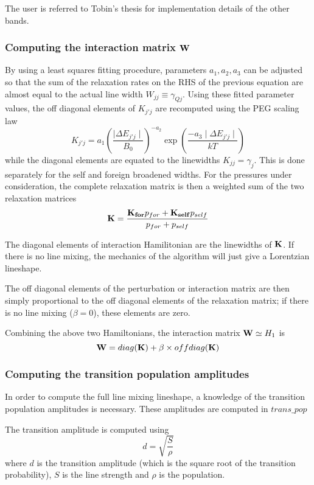 \documentclass[11pt]{article}
\begin{document}
The user is referred to Tobin's thesis \cite{tob:96} for implementation 
details of the other bands. 

\subsubsection{Computing the interaction matrix ${\bf W}$}
By using a least squares fitting procedure, parameters $a_{1},a_{2},a_{3}$
can be adjusted so that the sum of the relaxation rates
on the RHS of the previous equation are almost equal to the 
actual line width $W_{jj}\equiv\gamma_{Qj}$. Using these fitted parameter 
values, the off diagonal elements of $K_{j'j}$ are recomputed using the 
PEG scaling law
\[
 K_{j'j}=a_{1}\left(\frac{\mid\Delta E_{j'j}\mid}{B_{0}}\right)^{-a_{2}}
\exp\left(\frac{-a_{3}\mid\Delta E_{j'j}\mid}{kT}\right)
\]
while the diagonal elements are equated to the linewidths $K_{jj} = 
\gamma_{j}$. This is done separately for the self and foreign broadened 
widths. For the pressures under consideration, the complete relaxation 
matrix  is then a weighted sum of the two relaxation matrices
\[
{\bf K} = \frac{{\bf K_{for}}p_{for} + {\bf K_{self}}p_{self}}
                {p_{for}+p_{self}}
\]

The diagonal elements of interaction Hamilitonian are the linewidths of 
${\bf K}$. If there is no line mixing, the mechanics of the algorithm
will just give a Lorentzian lineshape.

The off diagonal elements of the perturbation or interaction matrix are 
then simply proportional to the off diagonal elements of the relaxation 
matrix; if there is no line mixing ($\beta = 0$), these elements are zero.

Combining the above two Hamiltonians, the interaction matrix 
${\bf W} \simeq H_{1}$ is
\[
{\bf W} = diag({\bf K}) + \beta \times offdiag({\bf K})
\]

\subsubsection{Computing the transition population amplitudes}
In order to compute the full line mixing lineshape, a knowledge of the
transition population amplitudes is necessary. These amplitudes are computed
in $trans\_pop$

The transition amplitude is computed using 
\[
d = \sqrt{\frac{S}{\rho}}
\]
where $d$ is the transition amplitude (which is the square root of the
transition probability), $S$ is the line strength and $\rho$ is the 
population.
\end{document}
